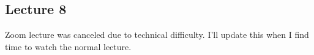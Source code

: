 \subsection{Lecture 8}

Zoom lecture was canceled due to technical difficulty. I'll update this when I find time to watch the normal lecture.